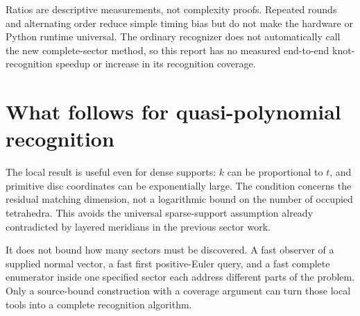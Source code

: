 \documentclass[11pt]{article}
\theoremstyle{definition}
\theoremstyle{remark}
\begin{document}
Ratios are descriptive measurements, not complexity proofs. Repeated rounds
and alternating order reduce simple timing bias but do not make the hardware
or Python runtime universal. The ordinary recognizer does not automatically
call the new complete-sector method, so this report has no measured
end-to-end knot-recognition speedup or increase in its recognition coverage.

\section{What follows for quasi-polynomial recognition}
\label{sec:global}

The local result is useful even for dense supports: $k$ can be proportional
to $t$, and primitive disc coordinates can be exponentially large. The
condition concerns the residual matching dimension, not a logarithmic bound
on the number of occupied tetrahedra. This avoids the universal sparse-support
assumption already contradicted by layered meridians in the previous sector
work.\cite{report57}

It does not bound how many sectors must be discovered. A fast observer of a
supplied normal vector, a fast first positive-Euler query, and a fast complete
enumerator inside one specified sector each address different parts of the
problem. Only a source-bound construction with a coverage argument can turn
those local tools into a complete recognition algorithm.
\end{document}
